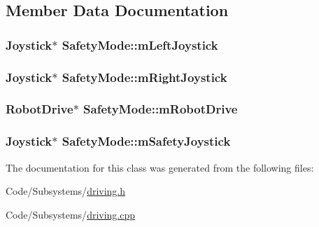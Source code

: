 \subsection{\-Member \-Data \-Documentation}
\hypertarget{class_safety_mode_a5aabae8f70168ba1f4796c60f919f9fb}{
\subsubsection[{m\-Left\-Joystick}]{\setlength{\rightskip}{0pt plus 5cm}\-Joystick$\ast$ {\bf \-Safety\-Mode\-::m\-Left\-Joystick}}}\label{class_safety_mode_a5aabae8f70168ba1f4796c60f919f9fb}
\hypertarget{class_safety_mode_a553f14cde6eff91b14031c0949c0b224}{
\subsubsection[{m\-Right\-Joystick}]{\setlength{\rightskip}{0pt plus 5cm}\-Joystick$\ast$ {\bf \-Safety\-Mode\-::m\-Right\-Joystick}}}\label{class_safety_mode_a553f14cde6eff91b14031c0949c0b224}
\hypertarget{class_safety_mode_a1cd788f74fc74e36d3c6d8722a6add4c}{
\subsubsection[{m\-Robot\-Drive}]{\setlength{\rightskip}{0pt plus 5cm}\-Robot\-Drive$\ast$ {\bf \-Safety\-Mode\-::m\-Robot\-Drive}}}\label{class_safety_mode_a1cd788f74fc74e36d3c6d8722a6add4c}
\hypertarget{class_safety_mode_a2243733be72ae3715163bdd39fbf28ec}{
\subsubsection[{m\-Safety\-Joystick}]{\setlength{\rightskip}{0pt plus 5cm}\-Joystick$\ast$ {\bf \-Safety\-Mode\-::m\-Safety\-Joystick}}}\label{class_safety_mode_a2243733be72ae3715163bdd39fbf28ec}


\-The documentation for this class was generated from the following files\-:\begin{DoxyCompactItemize}
\item 
\-Code/\-Subsystems/\hyperlink{driving_8h}{driving.\-h}\item 
\-Code/\-Subsystems/\hyperlink{driving_8cpp}{driving.\-cpp}\end{DoxyCompactItemize}
